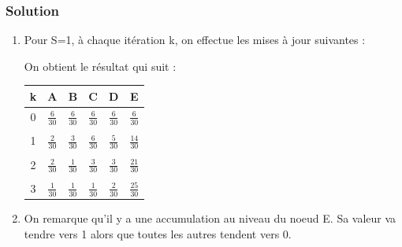     \subsubsection*{Solution}
    \begin{enumerate}
    
    \item Pour S=1, à chaque itération k, on effectue les mises à jour suivantes :
    
    On obtient le résultat qui suit :
    \begin{center}
        \begin{tabular}{c|ccccc}
        k & A & B & C & D & E\\ \hline 
    	0 & $\frac{6}{30}$ & $\frac{6}{30}$ & $\frac{6}{30}$ & $\frac{6}{30}$ & $\frac{6}{30}$\\ \\
    	1 & $\frac{2}{30}$ & $\frac{3}{30}$ & $\frac{6}{30}$ & $\frac{5}{30}$ & $\frac{14}{30}$\\ \\
    	2 & $\frac{2}{30}$ & $\frac{1}{30}$ & $\frac{3}{30}$ & $\frac{3}{30}$ & $\frac{21}{30}$\\ \\
    	3 & $\frac{1}{30}$ & $\frac{1}{30}$ & $\frac{1}{30}$ & $\frac{2}{30}$ & $\frac{25}{30}$\\
    	\end{tabular}
    \end{center}
    
    \item On remarque qu'il y a une accumulation au niveau du noeud E.
    Sa valeur va tendre vers 1 alors que toutes les autres tendent vers 0.
    

\end{enumerate}
